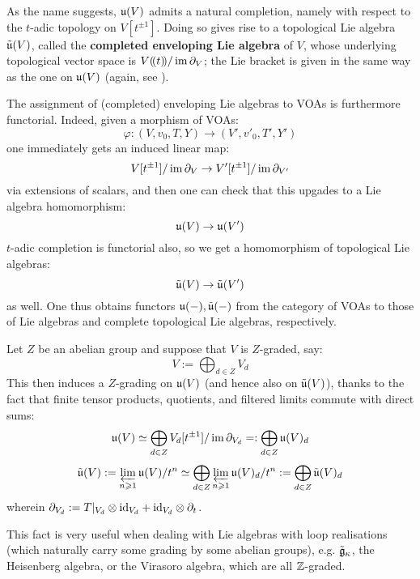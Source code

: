         As the name suggests, $\mathfrak{u}(V)$ admits a natural completion, namely with respect to the $t$-adic topology on $V[t^{\pm 1}]$. Doing so gives rise to a topological Lie algebra $\tilde{\mathfrak{u}}(V)$, called the \textbf{completed enveloping Lie algebra} of $V$, whose underlying topological vector space is $V(\!(t)\!)/\operatorname{im} \partial_V$; the Lie bracket is given in the same way as the one on $\mathfrak{u}(V)$ (again, see \cite[Theorem 4.1.2]{frenkel_ben_zvi_vertex_algebras_and_algebraic_curves}).

        \begin{remark}
            The assignment of (completed) enveloping Lie algebras to VOAs is furthermore functorial. Indeed, given a morphism of VOAs:
                $$\varphi: (V, v_0, T, Y) \to (V', v'_0, T', Y')$$
            one immediately gets an induced linear map:
                $$V[t^{\pm 1}]/\operatorname{im} \partial_V \to V'[t^{\pm 1}]/\operatorname{im} \partial_{V'}$$
            via extensions of scalars, and then one can check that this upgades to a Lie algebra homomorphism:
                $$\mathfrak{u}(V) \to \mathfrak{u}(V')$$
            $t$-adic completion is functorial also, so we get a homomorphism of topological Lie algebras:
                $$\tilde{\mathfrak{u}}(V) \to \tilde{\mathfrak{u}}(V')$$
            as well. One thus obtains functors $\mathfrak{u}(-), \tilde{\mathfrak{u}}(-)$ from the category of VOAs to those of Lie algebras and complete topological Lie algebras, respectively. 
        \end{remark}

        \begin{remark}
            Let $Z$ be an abelian group and suppose that $V$ is $Z$-graded, say:
                $$V := \bigoplus_{d \in Z} V_d$$
            This then induces a $Z$-grading on $\mathfrak{u}(V)$ (and hence also on $\tilde{\mathfrak{u}}(V)$), thanks to the fact that finite tensor products, quotients, and filtered limits commute with direct sums:
                $$\mathfrak{u}(V) \simeq \bigoplus_{d \in Z} V_d[t^{\pm 1}]/\operatorname{im} \partial_{V_d} =: \bigoplus_{d \in Z} \mathfrak{u}(V)_d$$
                $$\tilde{\mathfrak{u}}(V) := \varprojlim_{n \geqslant 1} \mathfrak{u}(V)/t^n \simeq \bigoplus_{d \in Z} \varprojlim_{n \geqslant 1} \mathfrak{u}(V)_d/t^n := \bigoplus_{d \in Z} \tilde{\mathfrak{u}}(V)_d$$
            wherein $\del_{V_d} := T|_{V_d} \tensor \id_{V_d} + \id_{V_d} \tensor \del_t$.

            This fact is very useful when dealing with Lie algebras with loop realisations (which naturally carry some grading by some abelian groups), e.g. $\tilde{\mathfrak{g}}_{\kappa}$, the Heisenberg algebra, or the Virasoro algebra, which are all $\mathbb{Z}$-graded.
        \end{remark}


